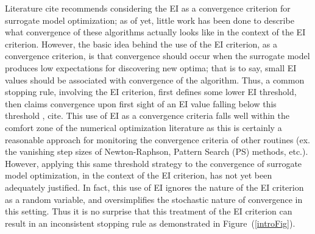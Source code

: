 \documentclass[12pt]{article}
\begin{document}
%
%

{\color{red}Literature cite} recommends considering the EI as a convergence criterion for surrogate model optimization; as of yet, little work has been done to describe what convergence of these algorithms actually looks like in the context of the EI criterion.
However, the basic idea behind the use of the EI criterion, as a convergence criterion, is that convergence should occur when the surrogate model produces low expectations for discovering new optima; that is to say, small EI values should be associated with convergence of the algorithm.
Thus, a common stopping rule, involving the EI criterion, first defines some lower EI threshold, then claims convergence upon first sight of an EI value falling below this threshold \cite{windExample}, {\color{red}cite}.    
This use of EI as a convergence criteria falls well within the comfort zone of the numerical optimization literature as this is certainly a reasonable approach for monitoring the convergence criteria of other routines (ex. the vanishing step sizes of Newton-Raphson, Pattern Search (PS) methods, etc.).
%
However, applying this same threshold strategy to the convergence of surrogate model optimization, in the context of the EI criterion, has not yet been adequately justified.
In fact, this use of EI ignores the nature of the EI criterion as a random variable, and oversimplifies the stochastic nature of convergence in this setting.
%
Thus it is no surprise that this treatment of the EI criterion can result in an inconsistent stopping rule as demonstrated in \mbox{Figure (\ref{introFig}).}  
\end{document}

